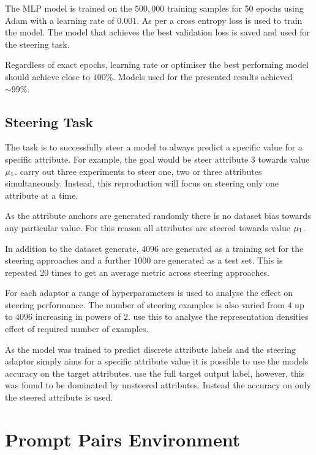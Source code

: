 The MLP model is trained on the $500,000$ training samples for 50 epochs using Adam \cite{adam} with a learning rate of $0.001$.
As per \citet{steering-clear} a cross entropy loss is used to train the model.
The model that achieves the best validation loss is saved and used for the steering task.

Regardless of exact epochs, learning rate or optimiser the best performing model should achieve close to $100\%$.
Models used for the presented results achieved $\sim 99\%$.

\subsection{Steering Task}

The task is to successfully steer a model to always predict a specific value for a specific attribute.
For example, the goal would be steer attribute $3$ towards value $\mathbf{\mu}_1$.
\citet{steering-clear} carry out three experiments to steer one, two or three attributes simultaneously.
Instead, this reproduction will focus on steering only one attribute at a time.

As the attribute anchors are generated randomly there is no dataset bias towards any particular value.
For this reason all attributes are steered towards value $\mathbf{\mu}_1$.

In addition to the dataset generate, $4096$ are generated as a training set for the steering approaches and a further $1000$ are generated as a test set.
This is repeated 20 times to get an average metric across steering approaches.

For each adaptor a range of hyperparameters is used to analyse the effect on steering performance.
The number of steering examples is also varied from $4$ up to $4096$ increasing in powers of $2$.
\citet{steering-clear} use this to analyse the representation densities effect of required number of examples.

 As the model was trained to predict discrete attribute labels and the steering adaptor simply aims for a specific attribute value it is possible to use the models accuracy on the target attributes.
\citet{steering-clear} use the full target output label, however, this was found to be dominated by unsteered attributes.
Instead the accuracy on only the steered attribute is used.

\section{Prompt Pairs Environment}
\label{prompt-pairs}

